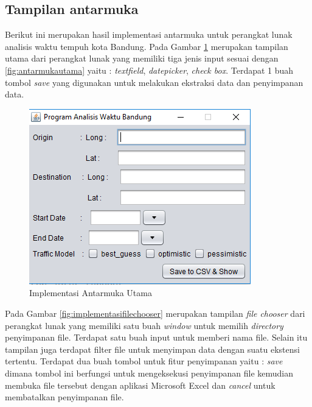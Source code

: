 \subsection{Tampilan antarmuka}
\label{subsec:tampilanantarmuka}

Berikut ini merupakan hasil implementasi antarmuka untuk perangkat lunak analisis waktu tempuh kota Bandung. Pada Gambar \ref{fig:implementasiantarmukautama} merupakan tampilan utama dari perangkat lunak yang memiliki tiga jenis input sesuai dengan \ref{fig:antarmukautama} yaitu : \textit{textfield}, \textit{datepicker}, \textit{check box}. Terdapat 1 buah tombol \textit{save} yang digunakan untuk melakukan ekstraksi data dan penyimpanan data.

\begin{figure}[H]
				\centering		
				\includegraphics[scale=0.7]{Gambar/gui1.png}
				\caption[Implementasi Antarmuka Utama]{Implementasi Antarmuka Utama}
				\label{fig:implementasiantarmukautama}	
			\end{figure}
			
Pada Gambar \ref{fig:implementasifilechooser} merupakan tampilan \textit{file chooser} dari perangkat lunak yang memiliki satu buah \textit{window} untuk memilih \textit{directory} penyimpanan file. Terdapat satu buah input untuk memberi nama file. Selain itu tampilan juga terdapat filter file untuk menyimpan data dengan suatu ekstensi tertentu. Terdapat dua buah tombol untuk fitur penyimpanan yaitu : \textit{save} dimana tombol ini berfungsi untuk mengeksekusi penyimpanan file kemudian membuka file tersebut dengan aplikasi Microsoft Excel dan \textit{cancel} untuk membatalkan penyimpanan file.

